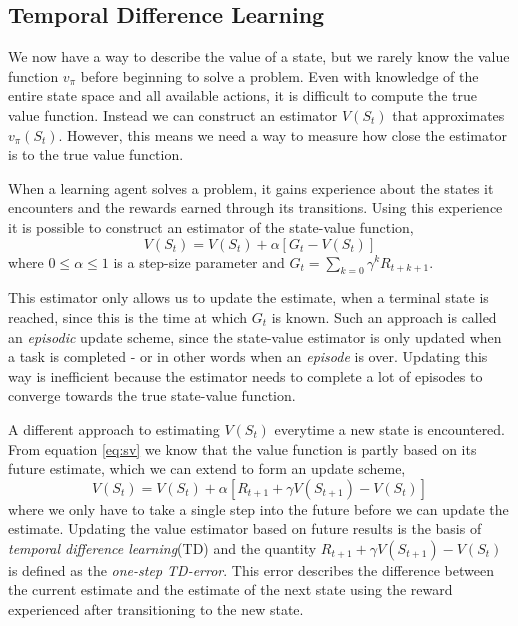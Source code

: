 \documentclass[11pt]{article}
\begin{document}
\maketitle

\subsection{Temporal Difference Learning}\label{sec:td}

We now have a way to describe the value of a state, but we rarely know the
value function $v_\pi$ before beginning to solve a problem.
Even with knowledge of the entire state space and all available actions,
it is difficult to compute the true value function.
Instead we can construct an estimator $V(S_t)$ that
approximates $v_\pi(S_t)$. However, this means we need a way
to measure how close the estimator is to the true value function.

When a learning agent solves a problem, it gains experience
about the states it encounters and the rewards earned through its transitions.
Using this experience it is possible to construct an estimator 
of the state-value function,
\begin{equation}
    V(S_t) = V(S_t) + \alpha [G_t - V(S_t)]
\end{equation}
where $0 \leq \alpha \leq 1$ is a step-size parameter and
$G_t = \sum\limits_{k=0} \gamma^k R_{t+k+1}$.

This estimator only allows us to update the estimate, when a
terminal state is reached, since this is the time at which $G_t$ is known.
Such an approach is called an \textit{episodic} update scheme, since the
state-value estimator is only updated when a task is completed -
or in other words when an \textit{episode} is over.
Updating this way is inefficient because the estimator needs to complete
a lot of episodes to converge towards the true state-value function.

A different approach to estimating $V(S_t)$ everytime a new state is encountered.
From equation \ref{eq:sv} we know that the value function is partly based on its future
estimate, which we can extend to form an update scheme,
\begin{equation}\label{eq:up}
    V(S_t) = V(S_t) + \alpha  [R_{t+1} + \gamma  V(S_{t+1}) - V(S_t)]
\end{equation}
where we only have to take a single step into the future before we can 
update the estimate.
Updating the value estimator based on future results is the basis
of \textit{temporal difference learning}(TD) and the quantity $R_{t+1} + \gamma  V(S_{t+1}) - V(S_t)$
is defined as the \textit{one-step TD-error}.
This error describes the difference between the current estimate
and the estimate of the next state using the reward experienced after
transitioning to the new state.
\end{document}
